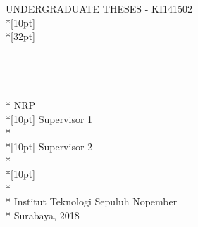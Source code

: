 \newpage
	\sffamily
	\thispagestyle{empty}
	{\noindent UNDERGRADUATE THESES - KI141502 } \\*[10pt]
	{\large\textbf{\MakeUppercase{\juduleng}}} \\*[32pt]
	\\
	\\
	\\
	\\
	\MakeUppercase{\penulis} \\*
	NRP \nrplama \\*[10pt]
	Supervisor 1 \\*
	\pembimbingsatu \\*[10pt]
	Supervisor 2 \\*
	\pembimbingdua \\*[10pt]
	\MakeUppercase{\jurusanlamaeng} \\*
	\fakultaslamaeng \\*
	Institut Teknologi Sepuluh Nopember \\*
	Surabaya, 2018
	\rmfamily
	\normalsize
	\restoregeometry
	\color{black}
	\cleardoublepage
